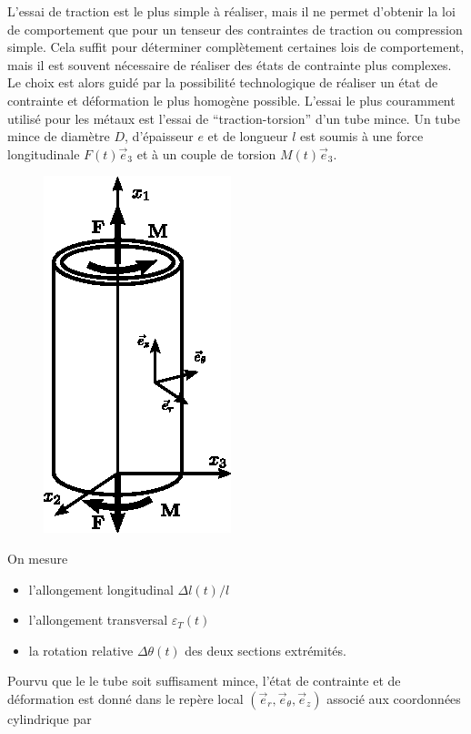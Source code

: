L'essai de traction est le plus simple à réaliser, mais il ne permet d'obtenir la loi de comportement que pour un tenseur des contraintes de traction ou compression simple.
Cela suffit pour déterminer complètement certaines lois de comportement, mais il est souvent nécessaire de réaliser des états de contrainte plus complexes.
Le choix est alors guidé par la possibilité technologique de réaliser un état de contrainte et déformation le plus homogène possible.
L'essai le plus couramment utilisé pour les métaux est l'essai de ``traction-torsion'' d'un tube mince.
Un tube mince de diamètre $D$, d'épaisseur $e$ et de longueur $l$ est soumis à une force longitudinale $F(t) \vec{e}_3$ et à un couple de torsion $M(t) \vec{e}_3$.

\begin{figure}
    \begin{center}
        \includegraphics{../images/T1_Ch04-0008}
    \end{center}
\end{figure}
On mesure
\begin{itemize}
    \item l'allongement longitudinal $\Delta l(t)/l$
    \item l'allongement transversal $\varepsilon_T(t)$
    \item la rotation relative $\Delta \theta(t)$ des deux sections extrémités.
\end{itemize}
Pourvu que le le tube soit suffisament mince, l'état de contrainte et de déformation est donné dans le repère local $\left(\vec{e}_r, \vec{e}_{\theta}, \vec{e}_z  \right)$ associé aux coordonnées cylindrique par
